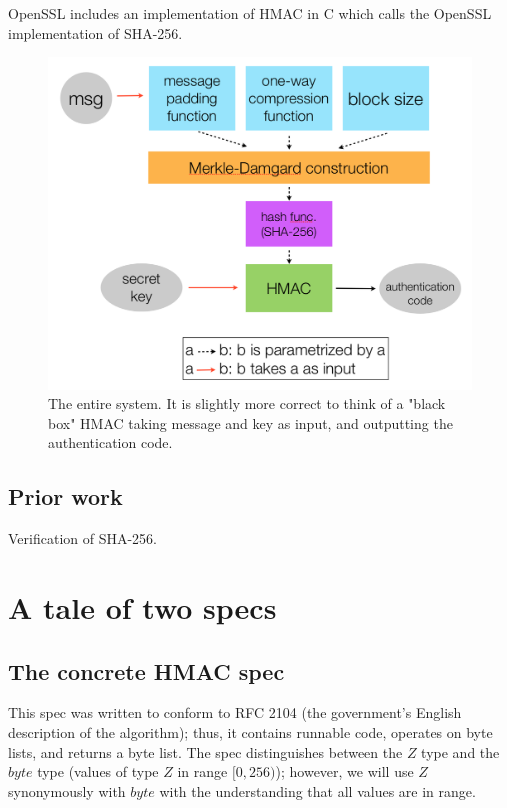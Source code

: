 \documentclass[twocolumn,showpacs,%
  nofootinbib,aps,superscriptaddress,%
  eqsecnum,prd,notitlepage,showkeys,10pt]{revtex4-1}
\begin{document}
OpenSSL includes an implementation of HMAC in C which calls the OpenSSL implementation of SHA-256.

\begin{figure}[h!]
	\centering
	\includegraphics[scale=0.4]{Cryptosystem}
	\caption{The entire system. It is slightly more correct to think of a "black box" HMAC taking message and key as input, and outputting the authentication code.}
\end{figure}

\subsection{Prior work}

Verification of SHA-256.


\section{A tale of two specs}

\subsection{The concrete HMAC spec}

This spec was written to conform to RFC 2104 (the government's English description of the algorithm); thus, it contains runnable code, operates on byte lists, and returns a byte list. The spec distinguishes between the $Z$ type and the $byte$ type (values of type $Z$ in range $[0, 256)$); however, we will use $Z$ synonymously with $byte$ with the understanding that all values are in range.
\end{document}
